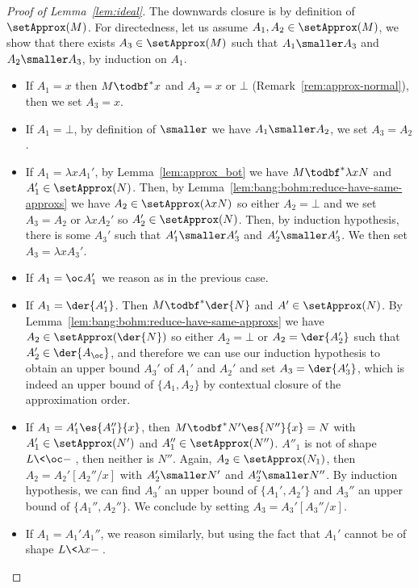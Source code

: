 \begin{proof}[Proof of Lemma~\ref{lem:ideal}]
	The downwards closure is by definition of $\setApprox(M)$. For
	directedness, let us assume $A_1, A_2 \in
			\setApprox(M)$, we show that there exists $A_3 \in \setApprox(M)$ such
			that $A_1 \smaller A_3$ and $A_2 \smaller A_3$, by
			induction on $A_1$.

	\begin{itemize}
		\item If $A_1 = x$ then $M\todbf^*x$ and
			$A_2 = x$ or $\bot$ (Remark~\ref{rem:approx-normal}), then we set $A_3=x$.
		\item If $A_1 = \bot$, by definition of $\smaller$ we
			have $A_1 \smaller A_2$, we set $A_3=A_2$.
		\item If $A_1 = \lambda x A_1'$, by
			Lemma~\ref{lem:approx_bot} we have
			$M \todbf^* \lambda x N$ and $A_1' \in
			\setApprox(N)$.
			Then, by
			Lemma~\ref{lem:bang:bohm:reduce-have-same-approxs}
			we have $A_2 \in \setApprox(\lambda x N)$ so
			either $A_2 = \bot$ 
			and we set $A_3=A_2$ or $\lambda x A_2'$ so
			$A_2' \in \setApprox(N)$.
			Then, by induction hypothesis, there
			is some $A_3'$ such that $A_1'\smaller A_3'$
			and $A_2'\smaller A_3'$. We then set
			$A_3=\lambda xA_3'$.
		\item If $A_1 = \oc A_1'$ we reason as in the previous case.
		\item If $A_1 = \der{A'_1}$.
			Then $M \todbf^* \der{N}$ and $A' \in \setApprox(N)$.
			By Lemma~\ref{lem:bang:bohm:reduce-have-same-approxs} we
			have $A_2 \in \setApprox(\der{N})$ so either
			$A_2 = \bot$ or $A_2 = \der{A_2'}$ such that
			$A_2' \in \der{A_\oc}$, and therefore we can use
			our induction hypothesis to obtain an
			upper bound $A_3'$ of $A_1'$ and $A_2'$ and set
			$A_3=\der{A_3'}$, which is indeed an upper bound
			of $\{A_1,A_2\}$ by contextual closure of the
			approximation order.
		\item If $A_1 = A'_1\es{A''_1}{x}$,
			then $M\todbf^* N'\es{N''}{x}= N$
			with $A_1' \in \setApprox(N')$ and $A_1'' \in
			\setApprox(N'')$.
			$A''_1$ is not of shape $L\<\oc-\>$, then
			neither is $N''$. Again,
			$A_2\in\setApprox(N_1)$, then
			$A_2=A_2'[A_2''/x]$ with $A_2'\smaller N'$
			and $A_2''\smaller N''$. By induction
			hypothesis, we can find $A_3'$ an upper bound of
			$\{A_1',A_2'\}$ and $A_3''$ an upper bound of
			$\{A_1'',A_2''\}$. We conclude by setting
			$A_3=A_3'[A_3''/x]$.
		\item If $A_1=A_1'A_1''$, we reason similarly, but using the
			fact that $A_1'$ cannot be of shape $L\<\lambda x -\>$. \qedhere
	\end{itemize}
\end{proof}



